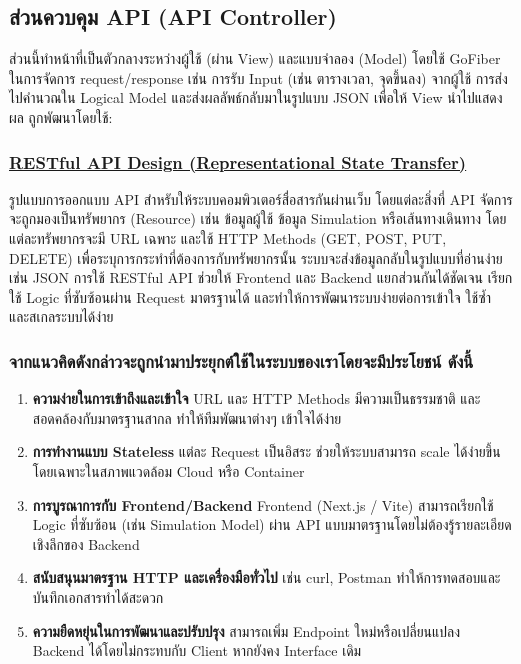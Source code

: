 \subsection{ส่วนควบคุม API (API Controller)}
  ส่วนนี้ทำหน้าที่เป็นตัวกลางระหว่างผู้ใช้ (ผ่าน View) และแบบจำลอง (Model) 
  โดยใช้ GoFiber ในการจัดการ request/response
  เช่น การรับ Input (เช่น ตารางเวลา, จุดขึ้นลง) จากผู้ใช้ 
  การส่งไปคำนวณใน Logical Model และส่งผลลัพธ์กลับมาในรูปแบบ JSON
  เพื่อให้ View นำไปแสดงผล ถูกพัฒนาโดยใช้:

\subsubsection{\textbf{\underline{RESTful API Design (Representational State Transfer)}}}
\begin{mypara}
    \indent รูปแบบการออกแบบ API สำหรับให้ระบบคอมพิวเตอร์สื่อสารกันผ่านเว็บ 
    โดยแต่ละสิ่งที่ API จัดการจะถูกมองเป็นทรัพยากร (Resource) 
    เช่น ข้อมูลผู้ใช้ ข้อมูล Simulation หรือเส้นทางเดินทาง โดยแต่ละทรัพยากรจะมี URL เฉพาะ 
    และใช้ HTTP Methods (GET, POST, PUT, DELETE) เพื่อระบุการกระทำที่ต้องการกับทรัพยากรนั้น 
    ระบบจะส่งข้อมูลกลับในรูปแบบที่อ่านง่าย เช่น JSON การใช้ RESTful API ช่วยให้ Frontend 
    และ Backend แยกส่วนกันได้ชัดเจน เรียกใช้ Logic ที่ซับซ้อนผ่าน Request มาตรฐานได้ 
    และทำให้การพัฒนาระบบง่ายต่อการเข้าใจ ใช้ซ้ำ และสเกลระบบได้ง่าย
\end{mypara}

\subsubsection{\textbf{จากแนวคิดดังกล่าวจะถูกนํามาประยุกต์ใช้ในระบบของเราโดยจะมีประโยชน์ ดังนี้}}
\begin{enumerate}
    \item \textbf{ความง่ายในการเข้าถึงและเข้าใจ}  
    URL และ HTTP Methods มีความเป็นธรรมชาติ และสอดคล้องกับมาตรฐานสากล ทำให้ทีมพัฒนาต่างๆ เข้าใจได้ง่าย
    \item \textbf{การทำงานแบบ Stateless}  
    แต่ละ Request เป็นอิสระ ช่วยให้ระบบสามารถ scale ได้ง่ายขึ้น โดยเฉพาะในสภาพแวดล้อม Cloud หรือ Container
    \item \textbf{การบูรณาการกับ Frontend/Backend}  
    Frontend (Next.js / Vite) สามารถเรียกใช้ Logic ที่ซับซ้อน (เช่น Simulation Model) ผ่าน API แบบมาตรฐานโดยไม่ต้องรู้รายละเอียดเชิงลึกของ Backend
    \item \textbf{สนับสนุนมาตรฐาน HTTP และเครื่องมือทั่วไป}  
    เช่น curl, Postman ทำให้การทดสอบและบันทึกเอกสารทำได้สะดวก
    \item \textbf{ความยืดหยุ่นในการพัฒนาและปรับปรุง}  
    สามารถเพิ่ม Endpoint ใหม่หรือเปลี่ยนแปลง Backend ได้โดยไม่กระทบกับ Client หากยังคง Interface เดิม
\end{enumerate}

